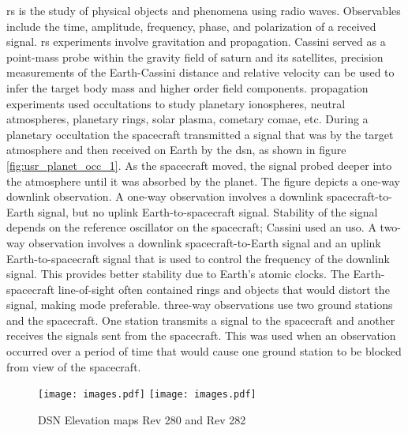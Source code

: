 \documentclass[oneside]{book}
\theoremstyle{mystyle}
\begin{document}
\gls{rs} is the study of physical objects and phenomena using \gls{radio waves}. Observables include the time, \gls{amplitude}, \gls{frequency}, \gls{phase}, and \gls{polarization} of a received signal. \gls{rs} experiments involve \gls{gravitation} and \gls{propagation}. Cassini served as a point-mass probe within the gravity field of \gls{saturn} and its satellites, precision measurements of the Earth-Cassini distance and \gls{relative velocity} can be used to infer the target body mass and higher order field components. \Gls{propagation} experiments used \glspl{occultation} to study planetary \glspl{ionosphere}, \glspl{neutral atmosphere}, \gls{planetary rings}, \gls{solar plasma}, \gls{cometary comae}, etc. During a planetary \gls{occultation} the spacecraft transmitted a signal that was  by the target atmosphere and then received on Earth by the \gls{dsn}, as shown in figure \ref{fig:usr_planet_occ_1}. As the spacecraft moved, the signal probed deeper into the atmosphere until it was absorbed by the planet. The figure depicts a one-way \gls{downlink} observation. A \gls{one-way observation} involves a \gls{downlink} spacecraft-to-Earth signal, but no \gls{uplink} Earth-to-spacecraft signal. Stability of the signal depends on the reference \gls{oscillator} on the spacecraft; Cassini used an \gls{uso}. A \gls{two-way observation} involves a \gls{downlink} spacecraft-to-Earth signal and an \gls{uplink} Earth-to-spacecraft signal that is used to control the frequency of the \gls{downlink} signal. This provides better stability due to Earth's atomic clocks. The Earth-spacecraft line-of-sight often contained rings and objects that would distort the signal, making  mode preferable. \Glspl{three-way observation} use two ground stations and the spacecraft. One station transmits a signal to the spacecraft and another receives the signals sent from the spacecraft. This was used when an observation occurred over a period of time that would cause one ground station to be blocked from view of the spacecraft.  
\begin{figure}[H]
	\centering
	\texttt{[image: images.pdf]}
	\hfill
	\texttt{[image: images.pdf]}
	\caption{DSN Elevation maps Rev 280 and Rev 282}
	\label{fig:usr_dsn_elav_map_1}
\end{figure}
\end{document}
